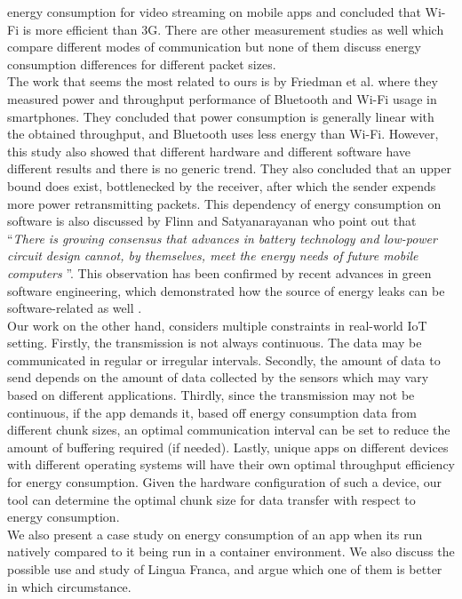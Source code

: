 energy consumption for video streaming on mobile apps and concluded that Wi-Fi is more 
efficient than 3G. There are other measurement studies as well which compare different modes 
of communication but none of them discuss energy consumption differences for different packet 
sizes. \\
The work that seems the most related to ours is by Friedman et al. \cite{6200281} where they measured 
power and throughput performance of Bluetooth and Wi-Fi usage in smartphones. They concluded that 
power consumption is generally linear with the obtained throughput, and Bluetooth uses less 
energy than Wi-Fi. However, this study also showed that different hardware and different software 
have different results and there is no generic trend. They also concluded that an upper bound 
does exist, bottlenecked by the receiver, after which the sender expends more power 
retransmitting packets. This dependency of energy consumption on software is also discussed by 
Flinn and Satyanarayanan \cite{4292824} who point out that \textquotedblleft \textit{There is growing 
consensus that advances in battery technology and low-power circuit design cannot, by themselves, 
meet the energy needs of future mobile computers} \textquotedblright \cite{4292824}. This observation 
has been confirmed by recent advances in green software engineering, which demonstrated how the 
source of energy leaks can be software-related as well \cite{6224257,10.1145/2652524.2652538,7886906}. \\
Our work on the other hand, considers multiple constraints in real-world IoT setting. Firstly, 
the transmission is not always continuous. The data may be communicated in regular or irregular 
intervals. Secondly, the amount of data to send depends on the amount of data collected by 
the sensors which may vary based on different applications. Thirdly, since the transmission may 
not be continuous, if the app demands it, based off energy consumption data from different chunk 
sizes, an optimal communication interval can be set to reduce the amount of buffering required 
(if needed). Lastly, unique apps on different devices with different operating systems will have 
their own optimal throughput efficiency for energy consumption. Given the hardware configuration 
of such a device, our tool can determine the optimal chunk size for data transfer with respect 
to energy consumption. \\
We also present a case study on energy consumption of an app when its run natively compared to it being 
run in a container environment. We also discuss the possible use and study of Lingua Franca, and argue 
which one of them is better in which circumstance.
